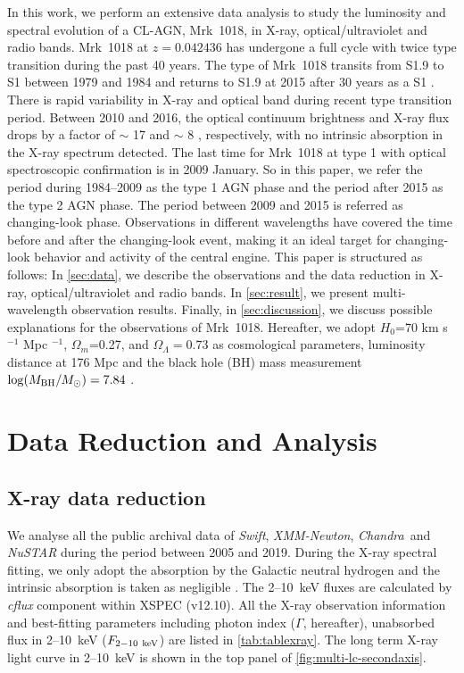 \documentclass[twocolumn]{aastex63}
\newcommand{\xmm}{{\em XMM-Newton}}
\newcommand{\nustar}{{\em NuSTAR }}
\newcommand{\chandra}{{\em Chandra}}
\newcommand{\swift}{{\small \it Swift}}
\begin{document}
In this work, we perform an extensive data analysis to study the luminosity and spectral evolution of a CL-AGN, Mrk~1018, in X-ray, optical/ultraviolet and radio bands. Mrk~1018 at $z=0.042436$ has undergone a full cycle with twice type transition during the past 40 years. The type of Mrk~1018 transits from S1.9 to S1 between 1979 and 1984 \citep{1986ApJ...311..135C} and returns to S1.9 at 2015 after 30 years as a S1 \citep[see also][]{2016A&A...593L...8M,2016A&A...593L...9H,2017A&A...607L...9K}. There is rapid variability in X-ray and optical band during recent type transition period. Between 2010 and 2016, the optical continuum brightness and X-ray flux drops by a factor of $\sim$ 17 and $\sim$ 8 \citep{2016A&A...593L...9H}, respectively, with no intrinsic absorption in the X-ray spectrum detected. The last time for Mrk~1018 at type 1 with optical spectroscopic confirmation is in 2009 January. So in this paper, we refer the period during 1984--2009 as the type 1 AGN phase and the period after 2015 as the type 2 AGN phase. The period between 2009 and 2015 is referred as changing-look phase. Observations in different wavelengths have covered the time before and after the changing-look event, making it an ideal target for changing-look behavior and activity of the central engine. This paper is structured as follows: In \autoref{sec:data}, we describe the observations and the data reduction in X-ray, optical/ultraviolet and radio bands. In \autoref{sec:result}, we present multi-wavelength observation results. Finally, in \autoref{sec:discussion}, we discuss possible explanations for the observations of Mrk~1018. Hereafter, we adopt $H_0$=70 km s$^{-1}$ Mpc $^{-1}$, $\Omega_{m}$=0.27, and $\Omega_{\Lambda}=0.73 $ as cosmological parameters, luminosity distance at 176 Mpc and the black hole (BH) mass measurement $\log(M_{\rm{BH}}/M_{\odot})=7.84$ \citep{2017MNRAS.472.3492E,2018MNRAS.480.3898N}. 


\section{Data Reduction and Analysis}\label{sec:data}
\subsection{X-ray data reduction}
We analyse all the public archival data of \swift, \xmm, \chandra ~and \nustar during the period between 2005 and 2019. During the X-ray spectral fitting, we only adopt the absorption by the Galactic neutral hydrogen \citep[$N_{\rm{HI,Gal}}$=0.0243$\times10^{22}$cm$^{-2}$,][]{2005A&A...440..775K} and the intrinsic absorption is taken as negligible \citep[see][]{2016A&A...593L...9H}. The 2--10~keV fluxes are calculated by {\it cflux} component within {\scriptsize XSPEC} (v12.10). All the X-ray observation information and best-fitting parameters including photon index ($\Gamma$, hereafter), unabsorbed flux in 2--10~keV ($F_{\rm{2-10~keV}}$) are listed in \autoref{tab:tablexray}. The long term X-ray light curve in 2--10~keV is shown in the top panel of \autoref{fig:multi-lc-secondaxis}.
\end{document}
